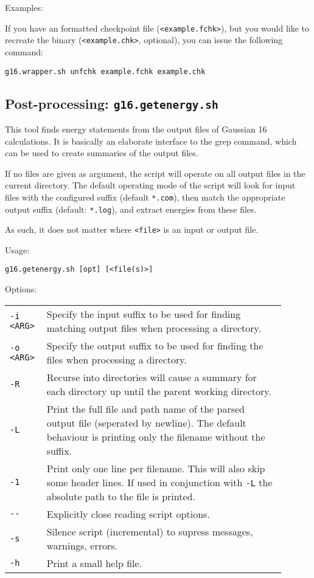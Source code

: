 \documentclass[   %
  final,          %
  a4paper         %
]{article}
\begin{document}
Examples:

If you have an formatted checkpoint file (\lstinline`<example.fchk>`), 
but you would like to recreate the binary (\lstinline`<example.chk>`, optional),
you can issue the following command:

\lstinline`g16.wrapper.sh unfchk example.fchk example.chk` 

\subsection{Post-processing: \texorpdfstring{{\lstinline`g16.getenergy.sh`}}{g16.getenergy.sh}}
\label{sec:g16.getenergy}

This tool finds energy statements from the output files of Gaussian 16 calculations.
It is basically an elaborate interface to the grep command, 
which can be used to create summaries of the output files.

If no files are given as argument, the script will operate on all output files in the current directory.
The default operating mode of the script will look for input files with the configured suffix (default \texttt{*.com}),
then match the appropriate output suffix (default: \texttt{*.log}),
and extract energies from these files.

As such, it does not matter where \lstinline`<file>` is an input or output file.

Usage: 

\lstinline`g16.getenergy.sh [opt] [<file(s)>]`

Options: 

\begin{tabular}{p{0.1\linewidth}p{0.8\linewidth}}
  {\lstinline`-i <ARG>`} & Specify the input suffix to be used for finding matching output files when processing a directory. \\
  {\lstinline`-o <ARG>`} & Specify the output suffix to be used for finding the files when processing a directory. \\
  {\lstinline`-R`}       & Recurse into directories will cause a summary for each directory up until the parent working directory.\\
  {\lstinline`-L`}       & Print the full file and path name of the parsed output file (seperated by newline). 
    The default behaviour is printing only the filename without the suffix. \\
  {\lstinline`-1`}       & Print only one line per filename.
    This will also skip some header lines.
    If used in conjunction with \lstinline`-L` the absolute path to the file is printed.\\
  {\lstinline`--`}       & Explicitly close reading script options. \\
  {\lstinline`-s`}       & Silence script (incremental) to supress messages, warnings, errors. \\
  {\lstinline`-h`}       & Print a small help file. \\
\end{tabular}
\end{document}
